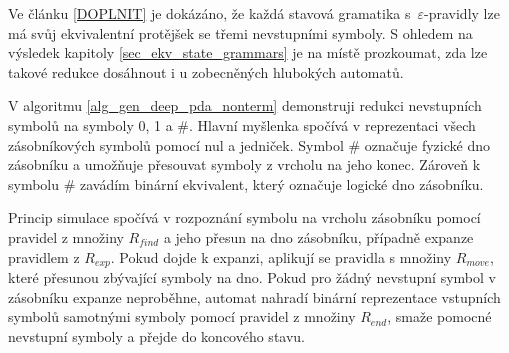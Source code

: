 
Ve článku \ref{DOPLNIT} je dokázáno, že každá stavová gramatika s~$\varepsilon$-pravidly lze má svůj ekvivalentní protějšek se třemi nevstupními symboly. S ohledem na výsledek kapitoly \ref{sec_ekv_state_grammars} je na místě prozkoumat, zda lze takové redukce dosáhnout i u zobecněných hlubokých automatů.

V algoritmu \ref{alg_gen_deep_pda_nonterm} demonstruji redukci nevstupních symbolů na symboly 0, 1 a \#. Hlavní myšlenka spočívá v reprezentaci všech zásobníkových symbolů pomocí nul a jedniček. Symbol \# označuje fyzické dno zásobníku a umožňuje přesouvat symboly z vrcholu na jeho konec. Zároveň k symbolu \# zavádím binární ekvivalent, který označuje logické dno zásobníku. 

Princip simulace spočívá v rozpoznání symbolu na vrcholu zásobníku pomocí pravidel z množiny $R_{find}$ a jeho přesun na dno zásobníku, případně expanze pravidlem z $R_{exp}$. Pokud dojde k expanzi, aplikují se pravidla s množiny $R_{move}$, které přesunou zbývající symboly na dno. Pokud pro žádný nevstupní symbol v zásobníku expanze neproběhne, automat nahradí binární reprezentace vstupních symbolů samotnými symboly pomocí pravidel z množiny $R_{end}$, smaže pomocné nevstupní symboly a přejde do koncového stavu.

